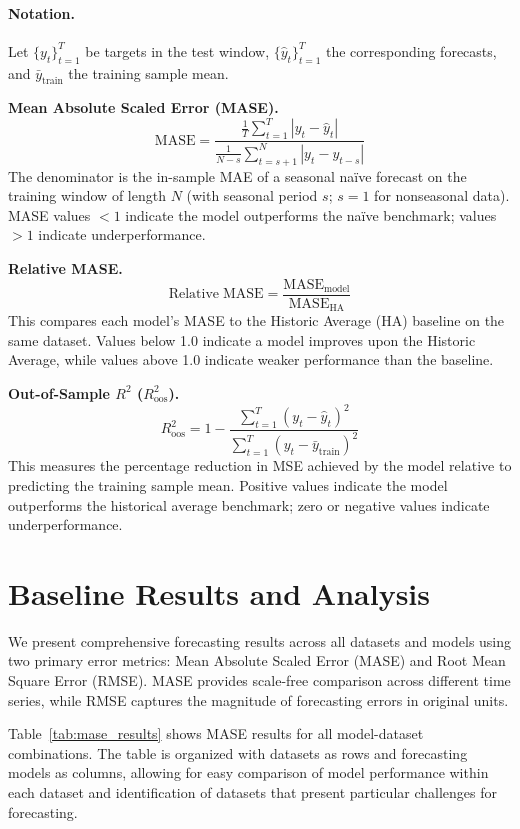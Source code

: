 \documentclass{article}
\begin{document}
\paragraph{Notation.} Let $\{y_t\}_{t=1}^T$ be targets in the test window, $\{\hat y_t\}_{t=1}^T$ the corresponding forecasts, and $\bar{y}_{\text{train}}$ the training sample mean.

\medskip
\noindent\textbf{Mean Absolute Scaled Error (MASE).}
\[
\mathrm{MASE}=\frac{\frac{1}{T}\sum_{t=1}^T |y_t-\hat y_t|}
{\displaystyle \frac{1}{N-s}\sum_{t=s+1}^{N} |y_t - y_{t-s}|}
\]
The denominator is the in-sample MAE of a seasonal naïve forecast on the training window of length $N$ (with seasonal period $s$; $s{=}1$ for nonseasonal data). MASE values $<1$ indicate the model outperforms the naïve benchmark; values $>1$ indicate underperformance.

\medskip
\noindent\textbf{Relative MASE.}
\[
\mathrm{Relative\;MASE}=\frac{\mathrm{MASE}_{\text{model}}}{\mathrm{MASE}_{\text{HA}}}
\]
This compares each model's MASE to the Historic Average (HA) baseline on the same dataset. Values below 1.0 indicate a model improves upon the Historic Average, while values above 1.0 indicate weaker performance than the baseline.

\medskip
\noindent\textbf{Out-of-Sample $R^2$ ($R^2_{\text{oos}}$).}
\[
R^2_{\text{oos}} = 1 - \frac{\sum_{t=1}^T (y_t-\hat y_t)^2}{\sum_{t=1}^T (y_t-\bar{y}_{\text{train}})^2}
\]
This measures the percentage reduction in MSE achieved by the model relative to predicting the training sample mean. Positive values indicate the model outperforms the historical average benchmark; zero or negative values indicate underperformance.


\section{Baseline Results and Analysis}
\label{sec:results}


We present comprehensive forecasting results across all datasets and models using two primary error metrics: Mean Absolute Scaled Error (MASE) and Root Mean Square Error (RMSE). MASE provides scale-free comparison across different time series, while RMSE captures the magnitude of forecasting errors in original units.

Table~\ref{tab:mase_results} shows MASE results for all model-dataset combinations. The table is organized with datasets as rows and forecasting models as columns, allowing for easy comparison of model performance within each dataset and identification of datasets that present particular challenges for forecasting.
\end{document}
